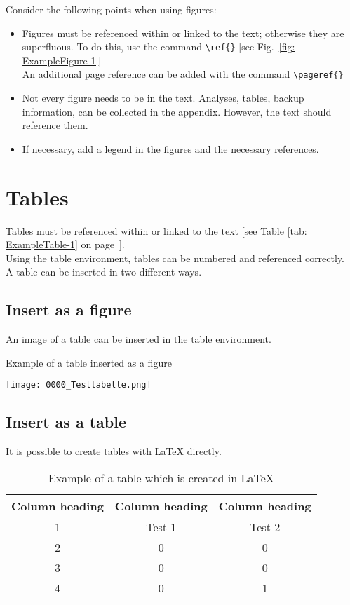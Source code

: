Consider the following points when using figures:
\begin{itemize}
	\item Figures must be referenced within or linked to the text; otherwise they are superfluous. To do this, use the command \verb|\ref{}|
	[see Fig.~\ref{fig: ExampleFigure-1}]\\
	An additional page reference can be added with the command \verb|\pageref{}| 
	\item Not every figure needs to be in the text. Analyses, tables, backup information, \etc can be collected in the appendix. However, the text should reference them.
	\item If necessary, add a legend in the figures and the necessary references.
\end{itemize}

\newpage
\section{Tables}
Tables must be referenced within or linked to the text [see Table \ref{tab: ExampleTable-1} on page~\pageref{tab: ExampleTable-1}].\\
Using the table environment, tables can be numbered and referenced correctly.\\
A table can be inserted in two different ways.
\subsection{Insert as a figure}
An image of a table can be inserted in the table environment.
\begin{table}[h]
	\centering
	\caption{Example of a table inserted as a figure}
	\texttt{[image: 0000\_Testtabelle.png]}
	\label{tab: ExampleTable-1} 
\end{table}
\subsection{Insert as a table}
It is possible to create tables with {\LaTeX} directly.
\begin{table}[h]
	\centering
	\caption{Example of a table which is created in \LaTeX}
	\begin{tabular}{c|c||c|}
		Column heading & Column heading & Column heading \\
		\midrule[2pt]
		1 & Test-1 & Test-2\\ 
		\hline 2 & 0 & 0  \\ 
		3 & 0 & 0  \\ 
		4 & 0 & 1  \\
		\hline 
	\end{tabular}
	\label{tab: ExampleTable-2} 
\end{table}

